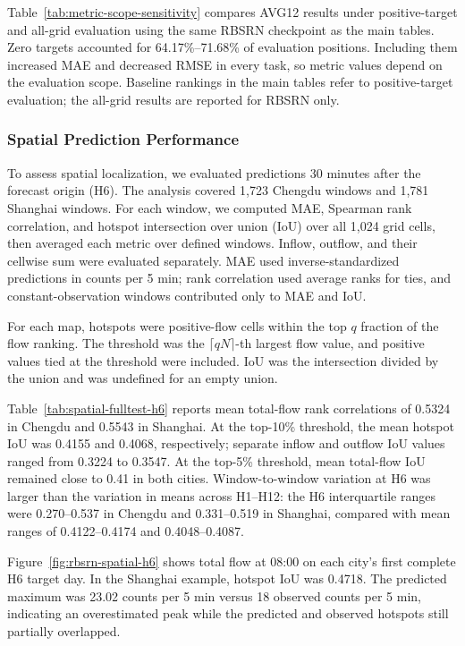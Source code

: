 
Table~\ref{tab:metric-scope-sensitivity} compares AVG12 results under positive-target and all-grid evaluation using the same RBSRN checkpoint as the main tables. Zero targets accounted for 64.17\%--71.68\% of evaluation positions. Including them increased MAE and decreased RMSE in every task, so metric values depend on the evaluation scope. Baseline rankings in the main tables refer to positive-target evaluation; the all-grid results are reported for RBSRN only.

\subsubsection{Spatial Prediction Performance}\label{sec:results-spatial}

To assess spatial localization, we evaluated predictions 30 minutes after the forecast origin (H6). The analysis covered 1,723 Chengdu windows and 1,781 Shanghai windows. For each window, we computed MAE, Spearman rank correlation, and hotspot intersection over union (IoU) over all 1,024 grid cells, then averaged each metric over defined windows. Inflow, outflow, and their cellwise sum were evaluated separately. MAE used inverse-standardized predictions in counts per 5 min; rank correlation used average ranks for ties, and constant-observation windows contributed only to MAE and IoU.

For each map, hotspots were positive-flow cells within the top \(q\) fraction of the flow ranking. The threshold was the \(\lceil qN\rceil\)-th largest flow value, and positive values tied at the threshold were included. IoU was the intersection divided by the union and was undefined for an empty union.



Table~\ref{tab:spatial-fulltest-h6} reports mean total-flow rank correlations of 0.5324 in Chengdu and 0.5543 in Shanghai. At the top-10\% threshold, the mean hotspot IoU was 0.4155 and 0.4068, respectively; separate inflow and outflow IoU values ranged from 0.3224 to 0.3547. At the top-5\% threshold, mean total-flow IoU remained close to 0.41 in both cities. Window-to-window variation at H6 was larger than the variation in means across H1--H12: the H6 interquartile ranges were 0.270--0.537 in Chengdu and 0.331--0.519 in Shanghai, compared with mean ranges of 0.4122--0.4174 and 0.4048--0.4087.

Figure~\ref{fig:rbsrn-spatial-h6} shows total flow at 08:00 on each city's first complete H6 target day. In the Shanghai example, hotspot IoU was 0.4718. The predicted maximum was 23.02 counts per 5 min versus 18 observed counts per 5 min, indicating an overestimated peak while the predicted and observed hotspots still partially overlapped.

